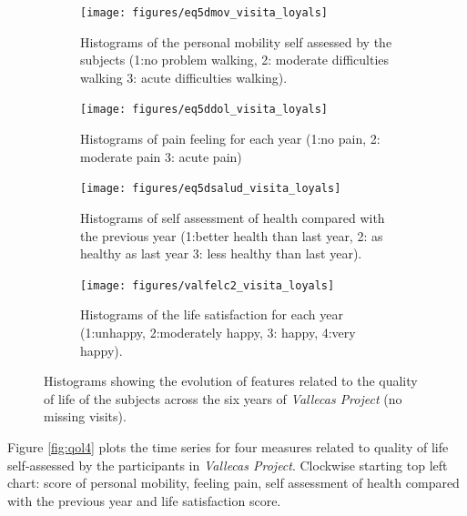 \documentclass[11pt]{article}
\theoremstyle{definition}
\theoremstyle{remark}
\begin{document}
\begin{figure}[!htb]
    \centering
    \begin{subfigure}[t]{0.4\textwidth}
        \centering
        \texttt{[image: figures/eq5dmov\_visita\_loyals]}
        \caption{Histograms of the personal mobility self assessed by the subjects (1:no problem walking, 2: moderate difficulties walking 3: acute difficulties walking).}
    \end{subfigure}
    \hfill
    \begin{subfigure}[t]{0.4\textwidth}
        \centering
        \texttt{[image: figures/eq5ddol\_visita\_loyals]}
        \caption{Histograms of pain feeling for each year (1:no pain, 2: moderate pain 3: acute pain)}
    \end{subfigure}%
    
     \begin{subfigure}[t]{0.4\textwidth}
        \centering
        \texttt{[image: figures/eq5dsalud\_visita\_loyals]}
        \caption{Histograms of self assessment of health compared with the previous year (1:better health than last year, 2: as healthy as last year 3: less healthy than last year).}
    \end{subfigure}
    \hfill
    \begin{subfigure}[t]{0.4\textwidth}
        \centering
        \texttt{[image: figures/valfelc2\_visita\_loyals]}
        \caption{Histograms of the life satisfaction for each year (1:unhappy, 2:moderately happy, 3: happy, 4:very happy).}
    \end{subfigure}%
    \caption{Histograms showing the evolution of features related to the quality of life of the subjects across the six years of \emph{Vallecas Project} (no missing visits).}
    \label{fig:qollong}
\end{figure}

Figure \ref{fig:qol4} plots the time series for four measures related to quality of life self-assessed by the participants in \emph{Vallecas Project}. Clockwise starting top left chart: score of personal mobility, feeling pain, self assessment of health compared with the previous year and life satisfaction score.
\end{document}
